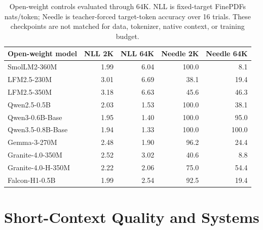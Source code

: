\begin{table}[h]
\centering
\scriptsize
\setlength{\tabcolsep}{3.4pt}
\begin{tabular}{lrrrr}
\toprule
\textbf{Open-weight model} & \textbf{NLL 2K} & \textbf{NLL 64K} & \textbf{Needle 2K} & \textbf{Needle 64K} \\
\midrule
SmolLM2-360M & 1.99 & 6.04 & 100.0 & 8.1 \\
LFM2.5-230M & 3.01 & 6.69 & 38.1 & 19.4 \\
LFM2.5-350M & 3.18 & 6.63 & 45.6 & 46.3 \\
Qwen2.5-0.5B & 2.03 & 1.53 & 100.0 & 38.1 \\
Qwen3-0.6B-Base & 1.95 & 1.40 & 100.0 & 95.0 \\
Qwen3.5-0.8B-Base & 1.94 & 1.33 & 100.0 & 100.0 \\
Gemma-3-270M & 2.48 & 1.90 & 96.2 & 24.4 \\
Granite-4.0-350M & 2.52 & 3.02 & 40.6 & 8.8 \\
Granite-4.0-H-350M & 2.22 & 2.06 & 75.0 & 54.4 \\
Falcon-H1-0.5B & 1.99 & 2.54 & 92.5 & 19.4 \\
\bottomrule
\end{tabular}
\caption{Open-weight controls evaluated through 64K. NLL is fixed-target FinePDFs nats/token; Needle is teacher-forced target-token accuracy over 16 trials. These checkpoints are not matched for data, tokenizer, native context, or training budget.}
\label{table:open_weight_controls}
\end{table}

\section{Short-Context Quality and Systems}
\label{appendix:quality}

